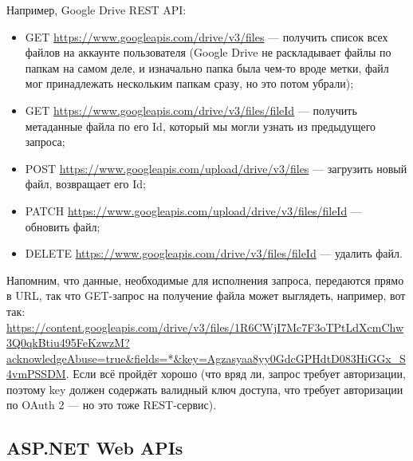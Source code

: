 \documentclass{../../text-style}
\begin{document}
Например, Google Drive REST API:

\begin{itemize}
    \item GET \url{https://www.googleapis.com/drive/v3/files} --- получить список всех файлов на аккаунте пользователя (Google Drive не раскладывает файлы по папкам на самом деле, и изначально папка была чем-то вроде метки, файл мог принадлежать нескольким папкам сразу, но это потом убрали);
    \item GET \url{https://www.googleapis.com/drive/v3/files/fileId} --- получить метаданные файла по его Id, который мы могли узнать из предыдущего запроса;
    \item POST \url{https://www.googleapis.com/upload/drive/v3/files} --- загрузить новый файл, возвращает его Id;
    \item PATCH \url{https://www.googleapis.com/upload/drive/v3/files/fileId} --- обновить файл;
    \item DELETE \url{https://www.googleapis.com/drive/v3/files/fileId} --- удалить файл.
\end{itemize}

Напомним, что данные, необходимые для исполнения запроса, передаются прямо в URL, так что GET-запрос на получение файла может выглядеть, например, вот так: \url{https://content.googleapis.com/drive/v3/files/1R6CWjI7Mc7F3oTPtLdXcmChw3Q0qkBtiu495FeKzwzM?acknowledgeAbuse=true&fields=*&key=Agzasyaa8yy0GdcGPHdtD083HiGGx_S4vmPSSDM}. Если всё пройдёт хорошо (что вряд ли, запрос требует авторизации, поэтому key должен содержать валидный ключ доступа, что требует авторизации по OAuth 2 --- но это тоже REST-сервис).

\subsection{ASP.NET Web APIs}
\end{document}
